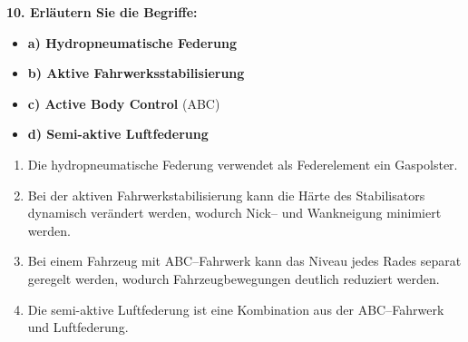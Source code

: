 \textbf{10. Erläutern Sie die Begriffe:}

\begin{itemize}
\item
  \textbf{a) Hydropneumatische Federung}
\item
  \textbf{b) Aktive Fahrwerksstabilisierung}
\item
  \textbf{c) Active Body Control} (ABC)
\item
  \textbf{d) Semi-aktive Luftfederung}
\end{itemize}

\begin{enumerate}
\def\labelenumi{\alph{enumi})}
\item
  Die hydropneumatische Federung verwendet als Federelement ein
  Gaspolster.
\item
  Bei der aktiven Fahrwerkstabilisierung kann die Härte des
  Stabilisators dynamisch verändert werden, wodurch Nick-- und
  Wankneigung minimiert werden.
\item
  Bei einem Fahrzeug mit ABC--Fahrwerk kann das Niveau jedes Rades
  separat geregelt werden, wodurch Fahrzeugbewegungen deutlich reduziert
  werden.
\item
  Die semi-aktive Luftfederung ist eine Kombination aus der
  ABC--Fahrwerk und Luftfederung.
\end{enumerate}
